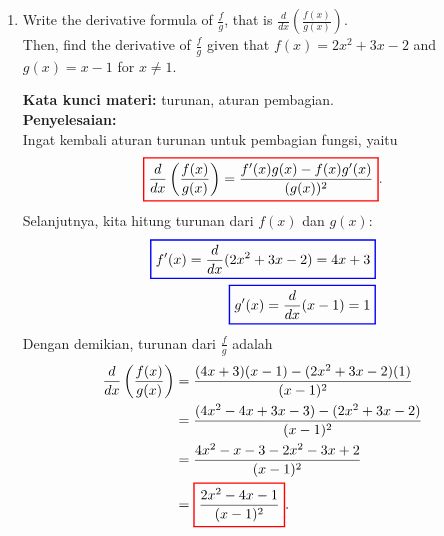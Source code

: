 \documentclass[10pt,openany,a4paper]{article}
\theoremstyle{definition}
\theoremstyle{definition}
\theoremstyle{plain}
\newenvironment{jawab}[2][tes]{%
\par\noindent\textbf{Kata kunci materi:} #1.\\
\textbf{Penyelesaian:} #2%
}{}
\begin{document}
\begin{enumerate}
    \item Write the derivative formula of \(\frac{f}{g}\), that is \(\frac{d}{dx}\left(\frac{f(x)}{g(x)}\right)\). \\
    Then, find the derivative of \(\frac{f}{g}\) given that \(f(x) = 2x^2 + 3x - 2\) and \(g(x) = x - 1\) for \(x \neq 1\).
    \begin{jawab}[turunan, aturan pembagian]{~\\
        Ingat kembali aturan turunan untuk pembagian fungsi, yaitu
        \[
        \colorlet{oldcolor}{.}
        \color{red}
        \setlength{\fboxrule}{1pt} \boxed{\color{oldcolor}\frac{d}{dx}\left(\frac{f(x)}{g(x)}\right) = \frac{f'(x)g(x) - f(x)g'(x)}{(g(x))^2}}\color{oldcolor}.
        \]
        Selanjutnya, kita hitung turunan dari \(f(x)\) dan \(g(x)\):
        \begin{align*}
            \colorlet{oldcolor}{.}
        \color{blue}
        \setlength{\fboxrule}{1pt} \boxed{\color{oldcolor}f'(x) = \frac{d}{dx}(2x^2 + 3x - 2) = 4x + 3}\color{oldcolor}\\
            \colorlet{oldcolor}{.}
        \color{blue}
        \setlength{\fboxrule}{1pt} \boxed{\color{oldcolor}g'(x) = \frac{d}{dx}(x - 1) = 1}\color{oldcolor}
        \end{align*}
        Dengan demikian, turunan dari \(\frac{f}{g}\) adalah
        \begin{align*}
            \frac{d}{dx}\left(\frac{f(x)}{g(x)}\right) &= \frac{(4x + 3)(x - 1) - (2x^2 + 3x - 2)(1)}{(x - 1)^2}\\
            &= \frac{(4x^2 - 4x + 3x - 3) - (2x^2 + 3x - 2)}{(x - 1)^2}\\
            &= \frac{4x^2 - x - 3 - 2x^2 - 3x + 2}{(x - 1)^2}\\
            &= \colorlet{oldcolor}{.}
        \color{red}
        \setlength{\fboxrule}{1pt} \boxed{\color{oldcolor}\frac{2x^2 - 4x - 1}{(x - 1)^2}}\color{oldcolor}.
        \end{align*}
    }
    \end{jawab}


\end{enumerate}
\end{document}
